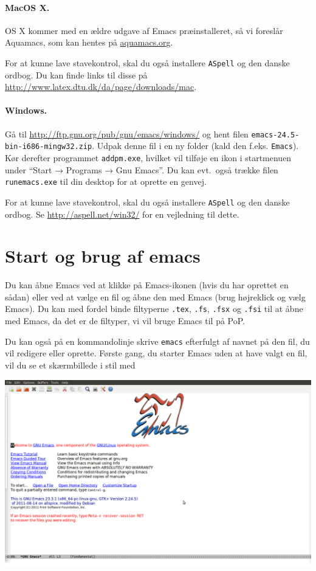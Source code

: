 \documentclass[a4paper]{article}
\begin{document}
\paragraph{MacOS X.} 

OS X kommer med en ældre udgave af Emacs præinstalleret, så vi
foreslår Aquamacs, som kan hentes på \url{aquamacs.org}.


For at kunne lave stavekontrol, skal du også installere
\texttt{ASpell} og den danske ordbog.  Du kan finde links til disse på
\url{http://www.latex.dtu.dk/da/page/downloads/mac}.

\paragraph{Windows.}

Gå til \url{http://ftp.gnu.org/pub/gnu/emacs/windows/} og hent
filen \texttt{emacs-24.5-bin-i686-mingw32.zip}.  Udpak denne fil i en
ny folder (kald den f.eks. \texttt{Emacs}).  Kør derefter programmet
\texttt{addpm.exe}, hvilket vil tilføje en ikon i startmenuen under
``Start → Programs → Gnu Emacs''.  Du kan evt.\ også trække filen
\texttt{runemacs.exe} til din desktop for at oprette en genvej.

For at kunne lave stavekontrol, skal du også installere
\texttt{ASpell} og den danske ordbog.  Se
\url{http://aspell.net/win32/} for en vejledning til dette. 

\section{Start og brug af emacs}

Du kan åbne Emacs ved at klikke på Emacs-ikonen (hvis du har oprettet
en sådan) eller ved at vælge en fil og åbne den med Emacs (brug
højreklick og vælg Emacs).  Du kan med fordel binde filtyperne
\texttt{.tex}, \texttt{.fs}, \texttt{.fsx} og \texttt{.fsi} til at
åbne med Emacs, da det er de filtyper, vi vil bruge Emacs til på PoP.

Du kan også på en kommandolinje skrive \texttt{emacs} efterfulgt af
navnet på den fil, du vil redigere eller oprette.  Første gang, du starter
Emacs uden at have valgt en fil, vil du se et skærmbillede i stil med

\begin{center}
{\includegraphics[width=\textwidth]{emacs-welcome.png}}
\end{center}
\end{document}
